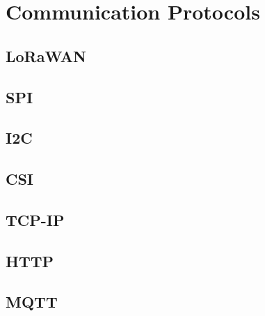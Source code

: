 \section{Communication Protocols}
\subsection{LoRaWAN}

\subsection{SPI}
\subsection{I2C}

\subsection{CSI}

\subsection{TCP-IP}
\subsection{HTTP}
\subsection{MQTT}